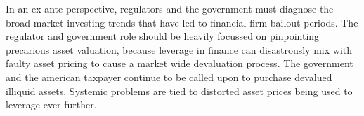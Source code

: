 In an ex-ante perspective, regulators and the government must diagnose the broad market investing trends that have led to financial firm bailout periods.  The regulator and government role should be heavily focussed on pinpointing precarious asset valuation, because leverage in finance can disastrously mix with faulty asset pricing to cause a market wide devaluation process.  The government and the american taxpayer continue to be called upon to purchase devalued illiquid assets.  Systemic problems are tied to distorted asset prices being used to leverage ever further.  


